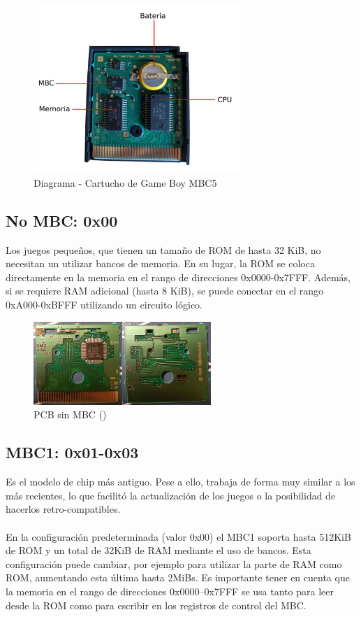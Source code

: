 \begin{figure}[H]
    \centering
    \includegraphics[width=0.7\textwidth]{include/images/cart.jpg}
    \caption{Diagrama - Cartucho de Game Boy MBC5}
    \label{figure:cart_gameboy}
\end{figure}

\subsection{No MBC: 0x00} Los juegos pequeños, que tienen un tamaño de ROM de hasta 32 KiB, no necesitan un utilizar bancos de memoria. En su lugar, la ROM se coloca directamente en la memoria en el rango de direcciones 0x0000-0x7FFF. Además, si se requiere RAM adicional (hasta 8 KiB), se puede conectar en el rango 0xA000-0xBFFF utilizando un circuito lógico.

\begin{figure}[H]
    \centering
    \includegraphics[width=0.6\textwidth]{include/images/nombc.jpg}
    \caption{PCB sin MBC (\cite{hardwaredatabase})}
    \label{figure:cart_no_mbc}
\end{figure}

\subsection{MBC1: 0x01-0x03} Es el modelo de chip más antiguo. Pese a ello, trabaja de forma muy similar a los más recientes, lo que facilitó la actualización de los juegos o la posibilidad de hacerlos retro-compatibles.
\\\\
En la configuración predeterminada (valor 0x00) el MBC1 soporta hasta 512KiB de ROM y un total de 32KiB de RAM mediante el uso de bancos. Esta configuración puede cambiar, por ejemplo para utilizar la parte de RAM como ROM, aumentando esta última hasta 2MiBs. Es importante tener en cuenta que la memoria en el rango de direcciones 0x0000–0x7FFF se usa tanto para leer desde la ROM como para escribir en los registros de control del MBC.

